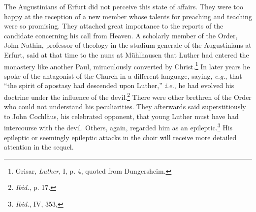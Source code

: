The Augustinians of Erfurt did not perceive this state of affairs.
They were too happy at the reception of a new member whose
talents for preaching and teaching were so promising. They attached
great importance to the reports of the candidate concerning his call
from Heaven. A scholarly member of the Order, John Nathin,
professor of theology in the studium generale of the Augustinians at
Erfurt, said at that time to the nuns at Mühlhausen that Luther
had entered the monastery like another Paul, miraculously converted by Christ.\footnote
{Grisar, \textit{Luther}, I, p. 4, quoted from Dungersheim.}
In later years he spoke of the antagonist of the
Church in a different language, saying, \textit{e.g.}, that “the spirit of
apostasy had descended upon Luther,” \textit{i.e.}, he had evolved his
doctrine under the influence of the devil.\footnote{\textit{Ibid.}, p. 17.}
There were other brethren of the Order who could not understand his peculiarities.
They afterwards said superstitiously to John Cochläus, his celebrated opponent,
that young Luther must have had intercourse with the devil. Others,
again, regarded him as an epileptic.\footnote{\textit{Ibid.}, IV, 353,}
His epileptic or seemingly epileptic attacks in the choir will receive more detailed attention
in the sequel.

